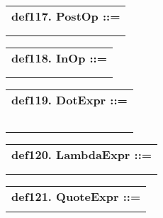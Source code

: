 \documentclass{report}
\begin{document}
\begin{tabular}{l}
{\bf def117. PostOp ::= }\\ 
\hspace*{3mm}{\tt LexicalPostfixOperator} \\ 
\hspace*{3mm}{\tt  $\mid$ "@" DotExpr} \\ 
\end{tabular}

\begin{tabular}{l}
{\bf def118. InOp ::= }\\ 
\hspace*{3mm}{\tt LexicalInfixOperator} \\ 
\hspace*{3mm}{\tt  $\mid$ "@" DotExpr} \\ 
\end{tabular}

\begin{tabular}{l}
{\bf def119. DotExpr ::= }\\ 
\hspace*{3mm}{\tt Name} \\ 
\hspace*{3mm}{\tt  $\mid$ "(" Expr ")"} \\ 
\hspace*{3mm}{\tt  $\mid$ "return"} \\ 
\hspace*{3mm}{\tt  $\mid$ "throw"} \\ 
\hspace*{3mm}{\tt  $\mid$ "new"} \\ 
\end{tabular}

\begin{tabular}{l}
{\bf def120. LambdaExpr ::= }\\ 
\hspace*{3mm}{\tt "(" Args "=$>$" StatementSeq ")"} \\ 
\hspace*{3mm}{\tt  $\mid$ "fun" Args "=$>$" StatementSeq "endfun"} \\ 
\end{tabular}

\begin{tabular}{l}
{\bf def121. QuoteExpr ::= }\\ 
\hspace*{3mm}{\tt "`" QuotedItems "`"} \\ 
\end{tabular}
\end{document}
